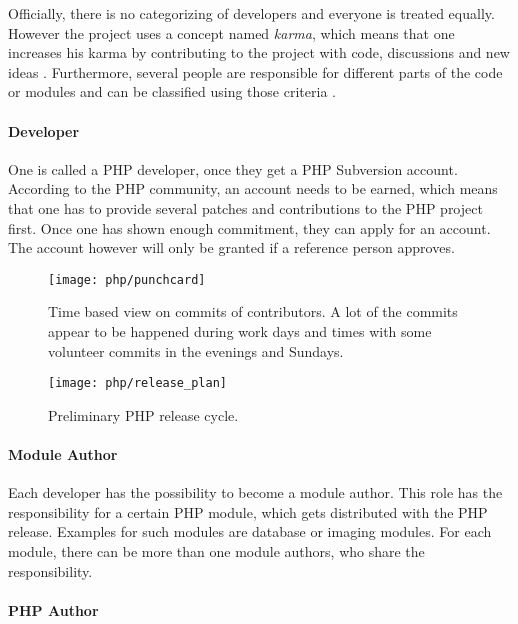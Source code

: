 Officially, there is no categorizing of developers and everyone is treated
equally. However the project uses a concept named \emph{karma}, which means
that one increases his karma by contributing to the project with code,
discussions and new ideas \cite{Magnusson2010}. Furthermore, several people are
responsible for different parts of the code or modules and can be classified
using those criteria \cite{PHPCredits}.

\paragraph{Developer}

One is called a PHP developer, once they get a PHP Subversion account.
According to the PHP community, an account needs to be earned, which means that
one has to provide several patches and contributions to the PHP project first.
Once one has shown enough commitment, they can apply for an account. The
account however will only be granted if a reference person approves.

\begin{figure}[htbp]
  \centering
  \texttt{[image: php/punchcard]}
  \caption[Time Based View on Commits, PHP]
  {Time based view on commits of contributors. A lot of the commits appear to
    be happened during work days and times with some volunteer commits in the
    evenings and Sundays.}
  \label{fig:php:p}
\end{figure}

\begin{figure}[htbp]
  \centering
  \texttt{[image: php/release\_plan]}
  \caption[Preliminary PHP Release Cycle]{Preliminary PHP release cycle.}
\end{figure}

\paragraph{Module Author}

Each developer has the possibility to become a module author. This role has the
responsibility for a certain PHP module, which gets distributed with the PHP
release. Examples for such modules are database or imaging modules. For each
module, there can be more than one module authors, who share the
responsibility.

\paragraph{PHP Author}

